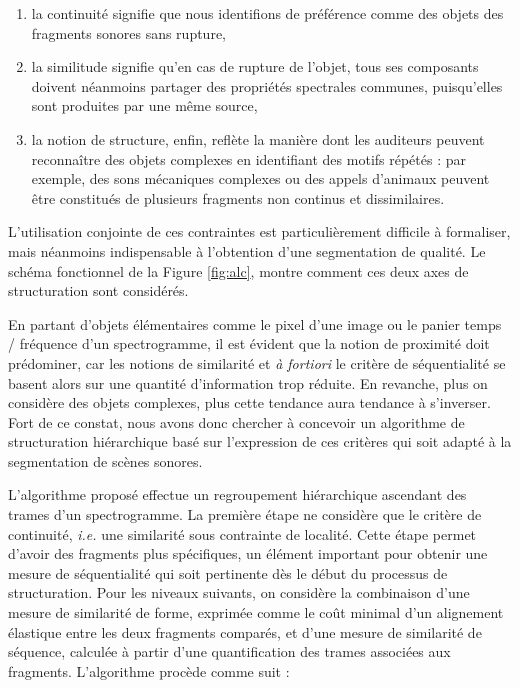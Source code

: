 \begin{enumerate}
\item la continuité signifie que nous identifions de préférence comme des objets des fragments sonores sans rupture,
\item la similitude signifie qu'en cas de rupture de l'objet, tous ses composants doivent néanmoins partager des propriétés spectrales communes, puisqu'elles sont produites par une même source,
\item la notion de  structure, enfin, reflète la manière dont les auditeurs peuvent reconnaître des objets complexes en identifiant des motifs répétés : par exemple, des sons mécaniques complexes ou des appels d'animaux peuvent être constitués de plusieurs fragments non continus et dissimilaires.
\end{enumerate}

L'utilisation conjointe de ces contraintes est particulièrement difficile à formaliser, mais néanmoins indispensable à l'obtention d'une segmentation de qualité. Le schéma fonctionnel de la Figure \ref{fig:alc}, montre comment ces deux axes de structuration sont considérés.


En partant d'objets élémentaires comme le pixel d'une image ou le panier temps / fréquence d'un spectrogramme, il est évident que la notion de proximité doit prédominer, car les notions de similarité et \textit{à fortiori} le critère de séquentialité se basent alors sur une quantité d'information trop réduite.  En revanche, plus on considère des objets complexes, plus cette tendance aura tendance à s'inverser. Fort de ce constat, nous avons donc chercher à concevoir un algorithme de structuration hiérarchique basé sur l'expression de ces critères qui soit adapté à la segmentation de scènes sonores\cite{rossignolhal-01122006}.

L'algorithme proposé effectue un regroupement hiérarchique ascendant des trames d'un spectrogramme. La première étape ne considère que le  critère de continuité, \textit{i.e.} une similarité sous contrainte de localité. Cette étape permet d'avoir des fragments plus spécifiques, un élément important pour obtenir une mesure de séquentialité qui soit pertinente dès le début du processus de structuration. Pour les niveaux suivants, on considère la combinaison d'une mesure de similarité de forme, exprimée comme le coût minimal d'un alignement élastique entre les deux fragments comparés, et d'une mesure de similarité de séquence, calculée à partir d'une quantification des trames associées aux fragments. L'algorithme procède comme suit :

